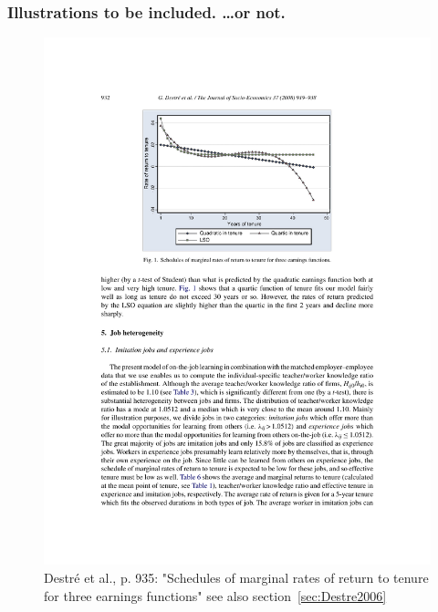\documentclass[12pt,a4paper]{article}
\begin{document}
  \subsubsection{Illustrations to be included. …or not.}
    \begin{figure}[ht]
      \centering
      \includegraphics[width=12cm]{Meeting 4 LEARNING FROM EXPERIENCE - Seite 932.pdf}
      \caption{Destré et al., p. 935: "Schedules of marginal rates of return to tenure for three earnings functions" see also section~\ref{sec:Destre2006}}
      \label{fig:Destré marginalreturntotenureearningfunction}
    \end{figure}
\end{document}
